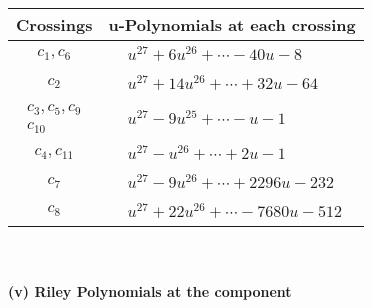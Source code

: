 \documentclass[1p]{elsarticle_modified}
\theoremstyle{definition}
\begin{document}
\begin{tabular}{m{50pt}|m{274pt}}
Crossings & \hspace{64pt}u-Polynomials at each crossing \\
\hline $$\begin{aligned}c_{1},c_{6}\end{aligned}$$&$\begin{aligned}
&u^{27}+6 u^{26}+\cdots-40 u-8
\end{aligned}$\\
\hline $$\begin{aligned}c_{2}\end{aligned}$$&$\begin{aligned}
&u^{27}+14 u^{26}+\cdots+32 u-64
\end{aligned}$\\
\hline $$\begin{aligned}c_{3},c_{5},c_{9}\\c_{10}\end{aligned}$$&$\begin{aligned}
&u^{27}-9 u^{25}+\cdots- u-1
\end{aligned}$\\
\hline $$\begin{aligned}c_{4},c_{11}\end{aligned}$$&$\begin{aligned}
&u^{27}- u^{26}+\cdots+2 u-1
\end{aligned}$\\
\hline $$\begin{aligned}c_{7}\end{aligned}$$&$\begin{aligned}
&u^{27}-9 u^{26}+\cdots+2296 u-232
\end{aligned}$\\
\hline $$\begin{aligned}c_{8}\end{aligned}$$&$\begin{aligned}
&u^{27}+22 u^{26}+\cdots-7680 u-512
\end{aligned}$\\
\hline
\end{tabular}\\~\\
\newpage\renewcommand{\arraystretch}{1}
\flushleft \textbf{(v) Riley Polynomials at the component}\newline \\
\end{document}
